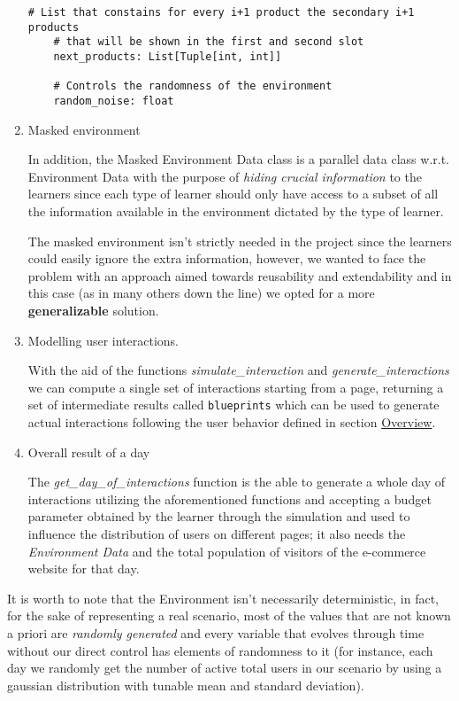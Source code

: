 \begin{enumerate}
\begin{lstlisting}[style=Python]
    # List that constains for every i+1 product the secondary i+1 products
    # that will be shown in the first and second slot
    next_products: List[Tuple[int, int]]

    # Controls the randomness of the environment
    random_noise: float
    \end{lstlisting}

    \item Masked environment

    In addition, the Masked Environment Data class is a parallel data class w.r.t. Environment Data with the purpose of \textit{hiding crucial information} to the learners since each type of learner should only have access to a subset of all the information available in the environment dictated by the type of learner.

    The masked environment isn't strictly needed in the project since the learners could easily ignore the extra information, however, we wanted to face the problem with an approach aimed towards reusability and extendability and in this case (as in many others down the line) we opted for a more \textbf{generalizable} solution.

    \item Modelling user interactions.

    With the aid of the functions \textit{simulate\_interaction} and \textit{generate\_interactions} we can compute a single set of interactions starting from a page, returning a set of intermediate results called \texttt{blueprints} which can be used to generate actual interactions following the user behavior defined in section \hyperref[sec:intro_overview]{Overview}.


    \item Overall result of a day

    The \textit{get\_day\_of\_interactions} function is the able to generate a whole day of interactions utilizing the aforementioned functions and accepting a budget parameter obtained by the learner through the simulation and used to influence the distribution of users on different pages; it also needs the \textit{Environment Data} and the total population of visitors of the e-commerce website for that day.
\end{enumerate}

It is worth to note that the Environment isn't necessarily deterministic, in fact, for the sake of representing a real scenario, most of the values that are not known a priori are \textit{randomly generated} and every variable that evolves through time without our direct control has elements of randomness to it (for instance, each day we randomly get the number of active total users in our scenario by using a gaussian distribution with tunable mean and standard deviation).

